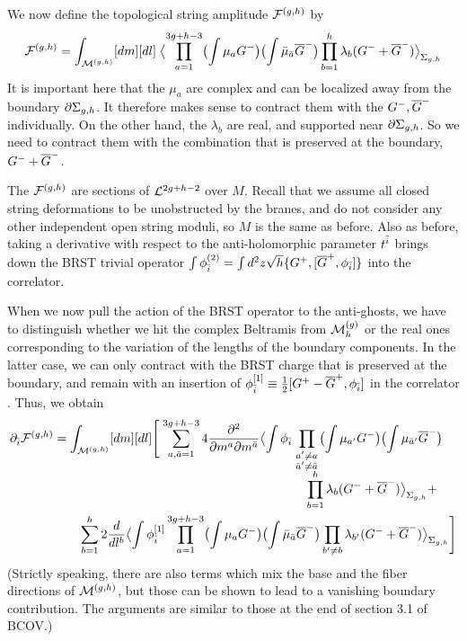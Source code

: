 We now define the topological string amplitude ${{\cal F}}^{(g,h)}$ by
\begin{equation}
\eqlabel{Fghopen}
\F gh = \int_{\calm gh}  [dm] [dl] \;\bigl\langle \prod_{a=1}^{3g+h-3} 
\bigl(\int \mu_a G^-\bigr)\bigl(\int \mub_\ab \Gb^-\bigr) 
\prod_{b=1}^{h} \lambda_b(G^-+\Gb^-)\bigr\rangle_{\Sigma_{g,h}}
\end{equation}
It is important here that the $\mu_a$ are complex and can be localized away 
from the boundary $\partial \Sigma_{g,h}$. It therefore makes sense to contract 
them with the $G^-,{\overline G}^-$ individually. On the other hand, the $\lambda_b$ 
are real, and supported near $\partial \Sigma_{g,h}$. So we need to contract 
them with the combination that is preserved at the boundary, $G^-+{\overline G}^-$.

The ${{\cal F}}^{(g,h)}$ are sections of ${\cal L}^{2g+h-2}$ over $M$. Recall that
we assume all closed string deformations to be unobstructed by the branes, 
and do not consider any other independent open string moduli, so $M$ is 
the same as before. Also as before, taking a derivative with respect to the 
anti-holomorphic parameter $t^{\bar i}$ brings down the BRST trivial 
operator $\int \phi_{\bar i}^{(2)}=\int d^2z\sqrt{h}\{G^+,[{\overline G}^+,\phi_{\bar i}]\}$ 
into the correlator. 

When we now pull the action of the BRST operator to the anti-ghosts,
we have to distinguish whether we hit the complex Beltramis from 
${\cal M}^{(g)}_h$ or the real ones corresponding to the variation of the 
lengths of the boundary components. In the latter case, we can only
contract with the BRST charge that is preserved at the boundary, and
remain with an insertion of $\phi_{\bar i}^{[1]}\equiv \frac 12[G^+-{\overline G}^+,
\phi_{\bar i}]$ in the correlator \cite{bcov2}. Thus, we obtain
\begin{equation}
\eqlabel{rough}
\begin{split}
\del_\ib \F gh &= \int_{\calm gh}[dm][dl] \Biggl[\;
\sum_{a,\ab=1}^{3g+h-3} 4 \frac{\del^2}{\del m^a\del m^\ab} \bigl\langle 
\int \phi_\ib \prod_{\topa{a'\neq a}{\ab'\neq\ab}}
\bigl(\int\mu_{a'} G^-\bigr)
\bigl(\int\mu_{\ab'} \Gb^-\bigr) \\[-.2cm]
&\qquad\qquad\qquad\qquad\qquad\qquad\qquad\qquad\qquad\qquad
\prod_{b=1}^h  \lambda_b(G^-+\Gb^-)
\bigr\rangle_{\Sigma_{g,h}}
+ \\
&\qquad\sum_{b=1}^h 2\frac{d}{dl^b}\bigl\langle \int\phi_\ib^{[1]}
\prod_{a=1}^{3g+h-3} 
\bigl(\int \mu_a G^-\bigr)\bigl(\int \mub_\ab \Gb^-\bigr) 
\prod_{b'\neq b} \lambda_{b'}(G^-+\Gb^-)
\bigr\rangle_{\Sigma_{g,h}} \Biggr]
\end{split}
\end{equation}
(Strictly speaking, there are also terms which mix the base and the fiber
directions of ${\cal M}^{(g,h)}$, but those can be shown to lead to a vanishing
boundary contribution. The arguments are similar to those at the end of 
section 3.1 of BCOV.)

